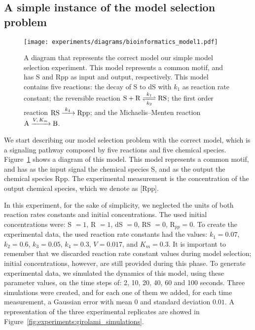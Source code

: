 \subsection{A simple instance of the model selection problem}
\begin{figure}[h]
\begin{center}
    \texttt{[image: experiments/diagrams/bioinformatics\_model1.pdf]}
    \caption{A diagram that represents the correct model our simple
model selection experiment. This model represents a common motif, and
has S and Rpp as input and output, respectively. This model contains
five reactions: the decay of S to dS with $k_1$ as reaction rate
constant; the reversible reaction $\ce{S + R <=>[$k_1$][$k_2$] RS}$; the
first order reaction $\ce{RS ->[$k_4$] Rpp}$; and the Michaelis--Menten
reaction $\ce{A ->[$V, K_m$] B}$.}
    \label{fig:experiments:girolami_model1}
    \end{center}
\end{figure}

We start describing our model selection problem with the correct model,
which is a signaling pathway composed by five reactions and five 
chemical species. Figure~\ref{fig:experiments:girolami_model1} shows a 
diagram of this model. This model represents a common motif, and has
as the input signal the chemical species S, and as the output the
chemical species Rpp. The experimental measurement is the concentration
of the output chemical species, which we denote as [Rpp].

In this experiment, for the sake of simplicity, we neglected the units of 
both reaction rates constants and initial concentrations. The used initial 
concentrations were:  S $= 1$, R $= 1$, dS $= 0$, RS $= 0$, 
R$_{pp} = 0$. To create the experimental data, the used reaction rate 
constants had the values: 
$k_1 = 0.07$, $k_2 = 0.6$, $k_3 = 0.05$, $k_4 = 0.3$, $V = 0.017$, and
$K_m = 0.3$. It is important to remember that we discarded reaction rate
constant values during model selection; initial concentrations, however,
are still provided during this phase. To generate experimental data, we
simulated the dynamics of this model, using these parameter values, on
the time steps of: 2, 10, 20, 40, 60 and 100 seconds. Three simulations
were created, and for each one of them we added, for each time measurement,
a Gaussian error with mean $0$ and standard deviation $0.01$. A
representation of the three experimental replicates are showed in 
Figure~\ref{fig:experiments:girolami_simulations}.

